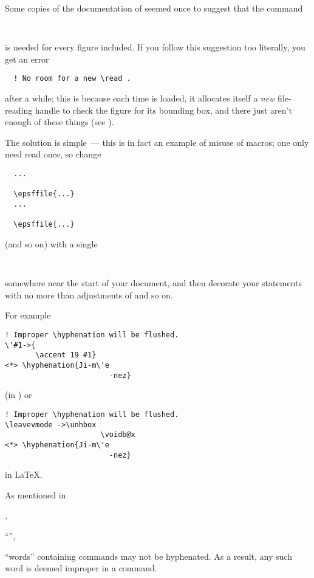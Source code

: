 
Some copies of the documentation of  seemed once to
suggest that the command
\begin{verbatim}
  
\end{verbatim}
is needed for every figure included.  If you follow this suggestion
too literally, you get an error
\begin{verbatim}
  ! No room for a new \read .
\end{verbatim}
after a while; this is because each time  is loaded, it
allocates itself a \emph{new} file-reading handle to check the figure
for its bounding box, and there just aren't enough of these things
(see ).

The solution is simple~--- this is in fact an example of misuse of
macros; one only need read  once, so change
\begin{verbatim}
  ...
  
  \epsffile{...}
  ...
  
  \epsffile{...}
\end{verbatim}
(and so on) with a single
\begin{verbatim}
  
\end{verbatim}
somewhere near the start of your document, and then decorate your
 statements with no more than adjustments of
 and so on.


For example
\begin{verbatim}
! Improper \hyphenation will be flushed.
\'#1->{
       \accent 19 #1}
<*> \hyphenation{Ji-m\'e
                        -nez}
\end{verbatim}
(in \plaintex{}) or
\begin{verbatim}
! Improper \hyphenation will be flushed.
\leavevmode ->\unhbox 
                      \voidb@x 
<*> \hyphenation{Ji-m\'e
                        -nez}
\end{verbatim}
in \LaTeX{}.

As mentioned in
\begin{flatversion}
  ,
\end{flatversion}
\begin{hyperversion}
  ``'',
\end{hyperversion}
``words'' containing  commands may not be hyphenated.  As
a result, any such word is deemed improper in a 
command.

